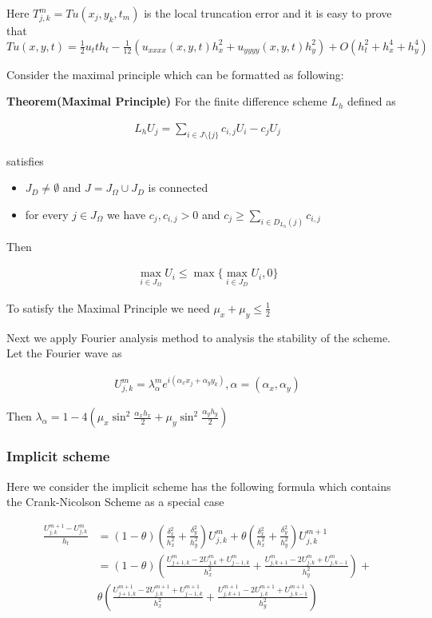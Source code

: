 \documentclass[12pt]{amsart}
\begin{document}
Here $T_{j,k}^m=Tu(x_j,y_k,t_m)$ is the local truncation error and it is easy to prove that $Tu(x,y,t)=\frac{1}{2}u_tt h_t-\frac{1}{12}(u_{xxxx}(x,y,t)h_x^2+u_{yyyy}(x,y,t)h_y^2)+O(h_t^2+h_x^4+h_y^4)$

Consider the maximal principle which can be formatted as following:

\textbf{Theorem(Maximal Principle)} For the finite difference scheme $L_h$ defined as

\begin{align*}
L_hU_j = \sum_{i\in J\setminus  \{j\}}c_{i,j}U_i-c_jU_j
\end{align*} 

satisfies

\begin{itemize}
\item $J_D\not=\emptyset$ and $J=J_\Omega \cup J_D$ is connected
\item for every $j\in J_\Omega$ we have $c_j,c_{i,j}>0$ and $c_j\ge \sum_{i\in D_{L_h}(j)}c_{i,j}$
\end{itemize}

Then

\begin{align*}
\max_{i\in J_\Omega} U_i \le \max\{\max_{i\in J_D}U_i,0\}
\end{align*}

To satisfy the Maximal Principle we need $\mu_x+\mu_y \le \frac{1}{2}$

Next we apply Fourier analysis method to analysis the stability of the scheme. Let the Fourier wave as

\begin{align*}
U_{j,k}^m =\lambda_\alpha^m e^{i(\alpha_xx_j+\alpha_yy_k)},\alpha=(\alpha_x,\alpha_y)
\end{align*}

Then $\lambda_\alpha=1-4(\mu_x\sin^2\frac{\alpha_x h_x}{2}+\mu_y\sin^2\frac{\alpha_yh_y}{2})$

\subsubsection{Implicit scheme} Here we consider the implicit scheme has the following formula which contains the Crank-Nicolson Scheme as a special case

\begin{align*}
\frac{U_{j,k}^{m+1}-U_{j,k}^{m}}{h_t}&=
(1-\theta)(\frac{\delta_x^2}{h_x^2}+\frac{\delta_y^2}{h_y^2})U_{j,k}^m+\theta(\frac{\delta_x^2}{h_x^2}+\frac{\delta_y^2}{h_y^2})U_{j,k}^{m+1}\\
&=
(1-\theta)(\frac{U_{j+1,k}^m-2U_{j,k}^m+U_{j-1,k}^m}{h_x^2} + \frac{U_{j,k+1}^m-2U_{j,k}^m+U_{j,k-1}^m}{h_y^2})+\\
&\theta (\frac{U_{j+1,k}^{m+1}-2U_{j,k}^{m+1}+U_{j-1,k}^{m+1}}{h_x^2} + \frac{U_{j,k+1}^{m+1}-2U_{j,k}^{m+1}+U_{j,k-1}^{m+1}}{h_y^2})
\end{align*}
\end{document}

